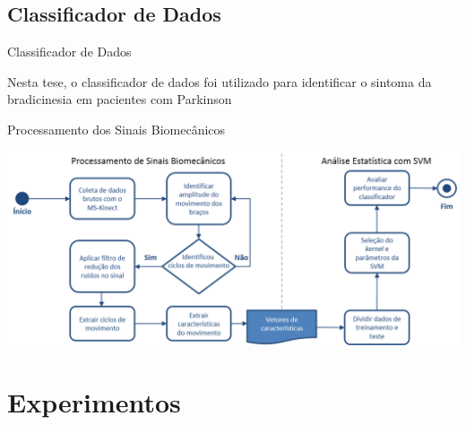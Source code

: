 \documentclass{beamer}
\begin{document}
\subsection{Classificador de Dados}
\begin{frame}{Classificador de Dados}
\begin{block}{}
			Nesta tese, o classificador de dados foi utilizado para identificar o sintoma da bradicinesia em pacientes com Parkinson
			
\end{block}

\end{frame}





\begin{frame}{Processamento dos Sinais Biomecânicos}
  
      \left \includegraphics[height=1.9 in]{img/biomecprocessorh.png}
  
\end{frame}






\section{Experimentos}
\end{document}
